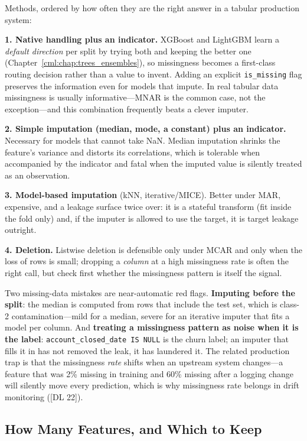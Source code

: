 Methods, ordered by how often they are the right answer in a tabular production system:

\textbf{1. Native handling plus an indicator.} XGBoost and LightGBM learn a \emph{default direction} per split by trying both and keeping the better one (Chapter~\ref{cml:chap:trees_ensembles}), so missingness becomes a first-class routing decision rather than a value to invent. Adding an explicit \texttt{is\_missing} flag preserves the information even for models that impute. In real tabular data missingness is usually informative---MNAR is the common case, not the exception---and this combination frequently beats a clever imputer.

\textbf{2. Simple imputation (median, mode, a constant) plus an indicator.} Necessary for models that cannot take NaN. Median imputation shrinks the feature's variance and distorts its correlations, which is tolerable when accompanied by the indicator and fatal when the imputed value is silently treated as an observation.

\textbf{3. Model-based imputation} (kNN, iterative/MICE). Better under MAR, expensive, and a leakage surface twice over: it is a stateful transform (fit inside the fold only) and, if the imputer is allowed to use the target, it is target leakage outright.

\textbf{4. Deletion.} Listwise deletion is defensible only under MCAR and only when the loss of rows is small; dropping a \emph{column} at a high missingness rate is often the right call, but check first whether the missingness pattern is itself the signal.

\begin{warningbox}
Two missing-data mistakes are near-automatic red flags. \textbf{Imputing before the split}: the median is computed from rows that include the test set, which is class-2 contamination---mild for a median, severe for an iterative imputer that fits a model per column. And \textbf{treating a missingness pattern as noise when it is the label}: \texttt{account\_closed\_date IS NULL} is the churn label; an imputer that fills it in has not removed the leak, it has laundered it. The related production trap is that the missingness \emph{rate} shifts when an upstream system changes---a feature that was 2\% missing in training and 60\% missing after a logging change will silently move every prediction, which is why missingness rate belongs in drift monitoring ([DL 22]).
\end{warningbox}

\subsection{How Many Features, and Which to Keep}

